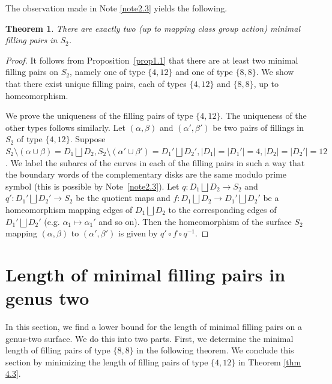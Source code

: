 \documentclass[11pt,reqno]{amsart}
\theoremstyle{plain}
\newtheorem{theorem}{Theorem}[section]
\theoremstyle{definition}
\theoremstyle{remark}
\numberwithin{equation}{section}
\numberwithin{figure}{section}
\begin{document}
The observation made in Note \ref{note2.3} yields the following.
\begin{theorem}
    There are exactly two (up to mapping class group action) minimal filling pairs in $S_2$.
\end{theorem}
\begin{proof}
    It follows from Proposition~\ref{prop1.1} that there are at least two minimal filling pairs on $S_2$, namely one of type $\{4,12\}$ and one of type $\{8,8\}$. We show that there exist unique filling pairs, each of types $\{4,12\}$ and $\{8,8\}$, up to homeomorphism. 

    We prove the uniqueness of the filling pairs of type $\{4,12\}$. The uniqueness of the other types follows similarly. Let $(\alpha, \beta)$ and $(\alpha', \beta')$ be two pairs of fillings in $S_2$ of type $\{4,12\}$. Suppose $S_2\setminus (\alpha\cup \beta)=D_1 \bigsqcup D_2, S_2\setminus (\alpha'\cup \beta')=D_1' \bigsqcup D_2', |D_1|=|D_1'|=4, |D_2|=|D_2'|= 12$. We label the subarcs of the curves in each of the filling pairs in such a way that the boundary words of the complementary disks are the same modulo prime symbol (this is possible by Note~\ref{note2.3}). Let $q: D_1 \bigsqcup D_2 \to S_2$ and $q': D_1' \bigsqcup D_2' \to S_2$ be the quotient maps and $f: D_1 \bigsqcup D_2 \to D_1' \bigsqcup D_2'$ be a homeomorphism mapping edges of $D_1 \bigsqcup D_2$ to the corresponding edges of $D_1' \bigsqcup D_2'$ (e.g. $\alpha_1 \mapsto \alpha_1'$ and so on). Then the homeomorphism of the surface $S_2$ mapping $(\alpha, \beta)$ to $(\alpha', \beta')$ is given by $q'\circ f \circ q^{-1}$.
\end{proof}


\section{Length of minimal filling pairs in genus two}
In this section, we find a lower bound for the length of minimal filling pairs on a genus-two surface. We do this into two parts. First, we determine the minimal length of filling pairs of type $\{8,8\}$ in the following theorem. We conclude this section by minimizing the length of filling pairs of type $\{4,12\}$ in Theorem \ref{thm 4.3}.
\end{document}

